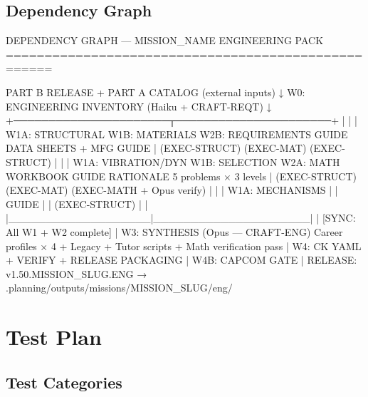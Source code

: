 \documentclass[11pt,letterpaper]{article}
\begin{document}
\subsection{Dependency Graph}

\begin{asciibox}
DEPENDENCY GRAPH — {MISSION_NAME} ENGINEERING PACK
====================================================

PART B RELEASE + PART A CATALOG (external inputs)
  ↓
W0: ENGINEERING INVENTORY (Haiku + CRAFT-REQT)
  ↓
  +──────────────────────┬──────────────────────+
  |                      |                      |
W1A: STRUCTURAL        W1B: MATERIALS         W2B: REQUIREMENTS
     GUIDE                  DATA SHEETS             + MFG GUIDE
  |  (EXEC-STRUCT)          (EXEC-MAT)              (EXEC-STRUCT)
  |                      |                      |
W1A: VIBRATION/DYN     W1B: SELECTION         W2A: MATH WORKBOOK
     GUIDE                  RATIONALE               5 problems × 3 levels
  |  (EXEC-STRUCT)          (EXEC-MAT)              (EXEC-MATH + Opus verify)
  |                      |                      |
W1A: MECHANISMS        |                      |
     GUIDE             |                      |
     (EXEC-STRUCT)     |                      |
  |___________________|_____________________|
                        |
  [SYNC: All W1 + W2 complete]
                        |
  W3: SYNTHESIS (Opus — CRAFT-ENG)
      Career profiles × 4 + Legacy + Tutor scripts
      + Math verification pass
                        |
  W4: CK YAML + VERIFY + RELEASE PACKAGING
                        |
  W4B: CAPCOM GATE
                        |
  RELEASE: v1.50.{MISSION_SLUG}.ENG
  → .planning/outputs/missions/{MISSION_SLUG}/eng/
\end{asciibox}

\section{Test Plan}

\subsection{Test Categories}
\end{document}
